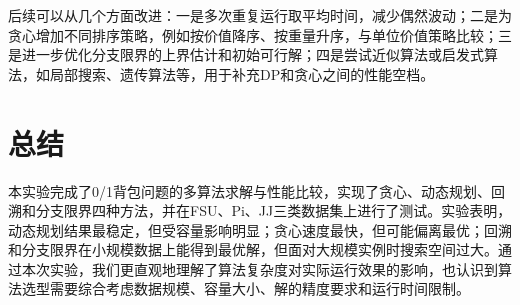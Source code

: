\documentclass[10.5pt,a4paper,fontset=none]{ctexart}
\begin{document}
后续可以从几个方面改进：一是多次重复运行取平均时间，减少偶然波动；二是为贪心增加不同排序策略，例如按价值降序、按重量升序，与单位价值策略比较；三是进一步优化分支限界的上界估计和初始可行解；四是尝试近似算法或启发式算法，如局部搜索、遗传算法等，用于补充DP和贪心之间的性能空档。

\FloatBarrier


\section{总结}

本实验完成了0/1背包问题的多算法求解与性能比较，实现了贪心、动态规划、回溯和分支限界四种方法，并在FSU、Pi、JJ三类数据集上进行了测试。实验表明，动态规划结果最稳定，但受容量影响明显；贪心速度最快，但可能偏离最优；回溯和分支限界在小规模数据上能得到最优解，但面对大规模实例时搜索空间过大。通过本次实验，我们更直观地理解了算法复杂度对实际运行效果的影响，也认识到算法选型需要综合考虑数据规模、容量大小、解的精度要求和运行时间限制。
\end{document}
